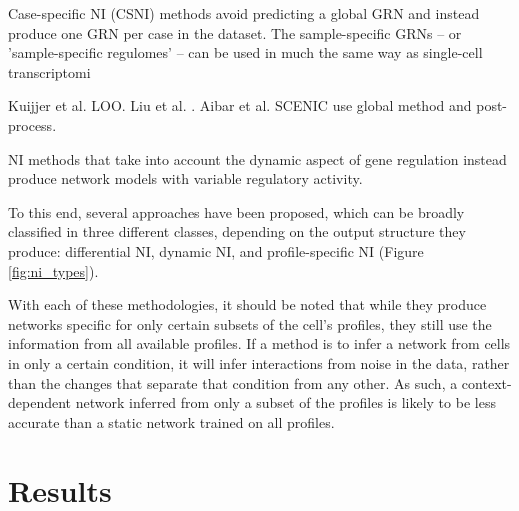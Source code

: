 Case-specific NI (CSNI) methods avoid predicting a global GRN and instead produce one GRN per case in the dataset.
The sample-specific GRNs -- or 'sample-specific regulomes' -- can be used in much the same way as single-cell transcriptomi

 Kuijjer et al.\cite{kuijjer_estimatingsamplespecificregulatory_2019} LOO. Liu et al. \cite{personalizedcharacterizationdiseases}. Aibar et al. SCENIC \cite{aibar_scenicsinglecellregulatory_2017} use global method and post-process.




NI methods that take into account the dynamic aspect of gene regulation instead produce network models with variable regulatory activity.

 To this end, several approaches have been proposed, which can be broadly classified in three different classes, depending on the output structure they produce: differential NI, dynamic NI, and profile-specific NI (Figure \ref{fig:ni_types}). 

With each of these methodologies, it should be noted that while they produce networks specific for only certain subsets of the cell's profiles, they still use the information from all available profiles. 
If a method is to infer a network from cells in only a certain condition, it will infer interactions from noise in the data, rather than the changes that separate that condition from any other.
As such, a context-dependent network inferred from only a subset of the profiles is likely to be less accurate than a static network trained on all profiles.



\section{Results}


